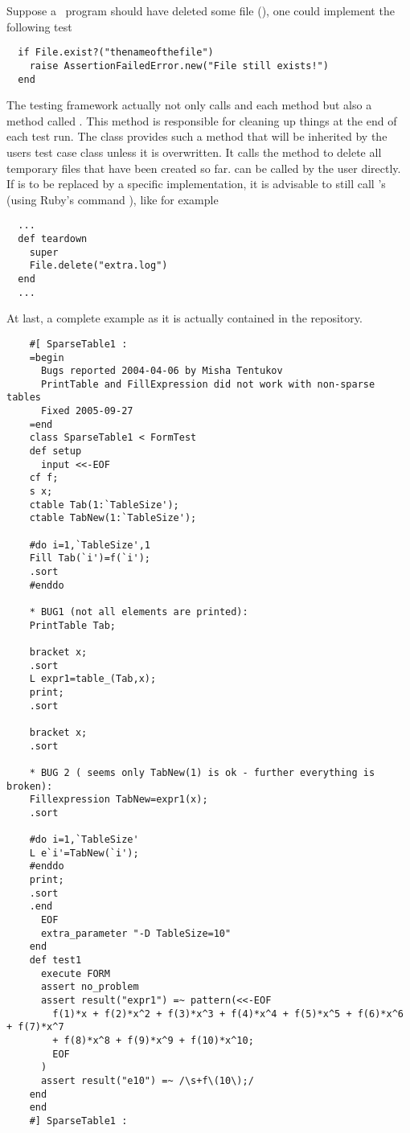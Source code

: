 Suppose a \FORM\ program should have deleted some file (), one could
implement the following test
\begin{verbatim}
  if File.exist?("thenameofthefile")
    raise AssertionFailedError.new("File still exists!")
  end
\end{verbatim}

The testing framework actually not only calls  and each  method
but also a method called . This method is responsible for cleaning
up things at the end of each test run. The class  provides such a
 method that will be inherited by the users test case class unless
it is overwritten. It calls the method  to delete all temporary
files that have been created so far.  can be called by the user
directly. If  is to be replaced by a specific implementation, it is
advisable to still call 's  (using Ruby's command
), like for example
\begin{verbatim}
  ...
  def teardown
    super
    File.delete("extra.log")
  end
  ...
\end{verbatim}

At last, a complete example as it is actually contained in the repository.
{\scriptsize
\begin{verbatim}
    #[ SparseTable1 :
    =begin
      Bugs reported 2004-04-06 by Misha Tentukov
      PrintTable and FillExpression did not work with non-sparse tables
      Fixed 2005-09-27
    =end
    class SparseTable1 < FormTest
    def setup
      input <<-EOF
    cf f;
    s x;
    ctable Tab(1:`TableSize');
    ctable TabNew(1:`TableSize');
    
    #do i=1,`TableSize',1
    Fill Tab(`i')=f(`i');
    .sort
    #enddo
    
    * BUG1 (not all elements are printed):
    PrintTable Tab;
    
    bracket x;
    .sort
    L expr1=table_(Tab,x);
    print;
    .sort
    
    bracket x;
    .sort
    
    * BUG 2 ( seems only TabNew(1) is ok - further everything is broken):
    Fillexpression TabNew=expr1(x);
    .sort
    
    #do i=1,`TableSize'
    L e`i'=TabNew(`i');
    #enddo
    print;
    .sort
    .end
      EOF
      extra_parameter "-D TableSize=10"
    end
    def test1
      execute FORM
      assert no_problem
      assert result("expr1") =~ pattern(<<-EOF
        f(1)*x + f(2)*x^2 + f(3)*x^3 + f(4)*x^4 + f(5)*x^5 + f(6)*x^6 + f(7)*x^7
        + f(8)*x^8 + f(9)*x^9 + f(10)*x^10;
        EOF
      )
      assert result("e10") =~ /\s+f\(10\);/
    end
    end
    #] SparseTable1 :
\end{verbatim}}

